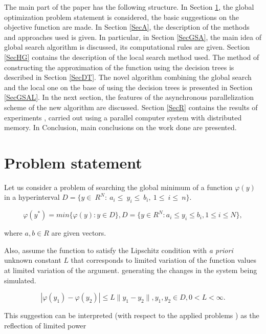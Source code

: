 \documentclass{svproc}
\begin{document}
The main part of the paper has the following structure.  In Section \ref{SecPS}, the global optimization problem statement is considered, the basic suggestions  on the objective function are made. In Section \ref{SecA}, the description of the methods and approaches used is given. In particular, in Section \ref{SecGSA},  the main idea of global search algorithm is discussed, its computational rules are given. Section \ref{SecHG} contains the description of the local search method used. The method of constructing the approximation of the function using the decision trees is described in  Section \ref{SecDT}. The novel algorithm combining the global search and the local one on the base of using the decision  trees is presented in Section \ref{SecGSAL}. In the next section,  the features of the asynchronous parallelization scheme of the new algorithm are discussed. Section \ref{SecR} contains the results of experiments , carried out using a parallel computer system  with distributed memory. In Conclusion, main conclusions on the work done are presented.


\section{Problem statement}\label{SecPS}

Let us consider a problem of searching the global minimum of a function $\varphi(y)$ in a hyperinterval  $D=\{ y\in\ R^N:\ a_i\le\ y_i\le\ b_i,\ 1\le\ i\le\ n \}$. 

\begin{equation} \label{sec:problem}   
	\varphi(y^*) = min\{\varphi(y):y\in D\}, D = \{y \in R^N : a_i \leq y_i \leq b_i, 1 \leq i \leq N \},
\end{equation}

where $a,b \in R$ are given vectors.

Also, assume the function to satisfy the Lipschitz condition with \textit{a priori} unknown constant  $L$ that corresponds to limited variation of the function values at limited variation of the argument.  generating the changes in the system being simulated.   

\begin{displaymath} 
	|\varphi(y_1)-\varphi(y_2)|\leq L\parallel y_1-y_2 \parallel ,y_1,y_2 \in D, 0<L< \infty. 
\end{displaymath}

This suggestion can be interpreted (with respect to the applied problems ) as the reflection of limited  power 
\end{document}
